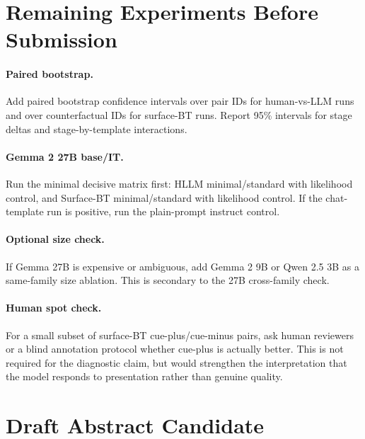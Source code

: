 \documentclass[11pt]{article}
\begin{document}
\section{Remaining Experiments Before Submission}

\paragraph{Paired bootstrap.}
Add paired bootstrap confidence intervals over pair IDs for human-vs-LLM runs
and over counterfactual IDs for surface-BT runs. Report 95\% intervals for
stage deltas and stage-by-template interactions.

\paragraph{Gemma 2 27B base/IT.}
Run the minimal decisive matrix first: HLLM minimal/standard with likelihood
control, and Surface-BT minimal/standard with likelihood control. If the
chat-template run is positive, run the plain-prompt instruct control.

\paragraph{Optional size check.}
If Gemma 27B is expensive or ambiguous, add Gemma 2 9B or Qwen 2.5 3B as a
same-family size ablation. This is secondary to the 27B cross-family check.

\paragraph{Human spot check.}
For a small subset of surface-BT cue-plus/cue-minus pairs, ask human reviewers
or a blind annotation protocol whether cue-plus is actually better. This is not
required for the diagnostic claim, but would strengthen the interpretation
that the model responds to presentation rather than genuine quality.

\section{Draft Abstract Candidate}
\end{document}
